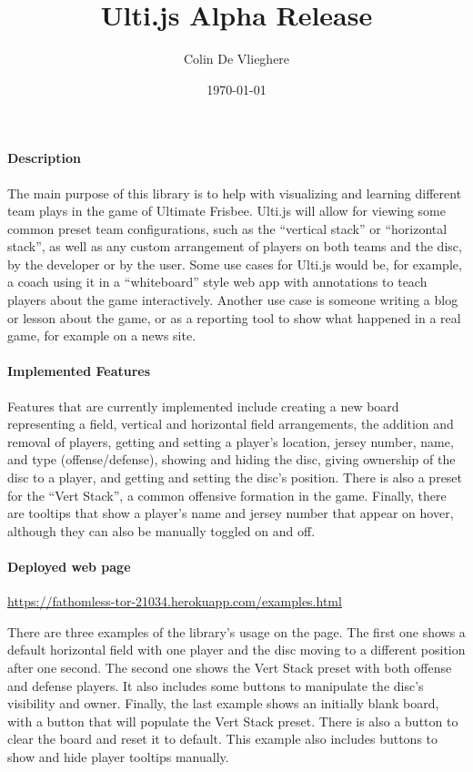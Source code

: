 \documentclass[letterpaper,11pt]{article}
\title{Ulti.js Alpha Release}
\author{Colin De Vlieghere}
\date{\today}
\begin{document}
\maketitle

\paragraph{Description}
The main purpose of this library is to
help with visualizing and learning different team plays in the game of Ultimate Frisbee.
Ulti.js will allow for viewing some common preset team configurations, such as the 
``vertical stack'' or ``horizontal stack'', as well as any custom arrangement of players
on both teams and the disc, by the developer or by the user.
Some use cases for Ulti.js would be, for example, a coach using it in a ``whiteboard''
style web app with annotations to teach players about the game interactively. Another use case 
is someone writing a blog or lesson about the game, or as a reporting tool to show what happened 
in a real game, for example on a news site.

\paragraph{Implemented Features}
Features that are currently implemented include creating a new board representing a field,
vertical and horizontal field arrangements, the addition and removal of players, getting and setting a
player's location, jersey number, name, and type (offense/defense), showing and hiding the
disc, giving ownership of the disc to a player, and getting and setting the disc's position.
There is also a preset for the ``Vert Stack'', a common offensive formation in the game.
Finally, there are tooltips that show a player's name and jersey number that appear on hover,
although they can also be manually toggled on and off.

\paragraph{Deployed web page}
\href{https://fathomless-tor-21034.herokuapp.com/examples.html}{https://fathomless-tor-21034.herokuapp.com/examples.html}

There are three examples of the library's usage on the page.
The first one shows a default horizontal field with one player and the disc moving to a different
position after one second.
The second one shows the Vert Stack preset with both offense and defense players. It also includes
some buttons to manipulate the disc's visibility and owner.
Finally, the last example shows an initially blank board, with a button that will populate the
Vert Stack preset. There is also a button to clear the board and reset it to default.
This example also includes buttons to show and hide player tooltips manually.
\end{document}
